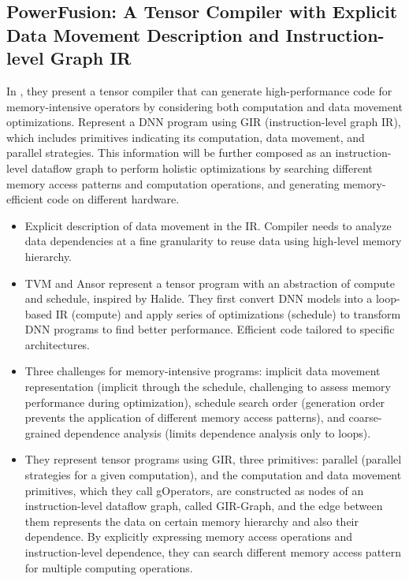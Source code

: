 \subsection{PowerFusion: A Tensor Compiler with Explicit Data Movement Description and Instruction-level Graph IR}
In \cite{ma_powerfusion_2023}, they present a tensor compiler that can generate high-performance code for memory-intensive operators by considering both computation and data movement optimizations. Represent a DNN program using GIR (instruction-level graph IR), which includes primitives indicating its computation, data movement, and parallel strategies. This information will be further composed as an instruction-level dataflow graph to perform holistic optimizations by searching different memory access patterns and computation operations, and generating memory-efficient code on different hardware.
\begin{itemize}
    \item Explicit description of data movement in the IR. Compiler needs to analyze data dependencies at a fine granularity to reuse data using high-level memory hierarchy.
    \item TVM and Ansor represent a tensor program with an abstraction of compute and schedule, inspired by Halide. They first convert DNN models into a loop-based IR (compute) and apply series of optimizations (schedule) to transform DNN programs to find better performance. Efficient code tailored to specific architectures.
    \item Three challenges for memory-intensive programs: implicit data movement representation (implicit through the schedule, challenging to assess memory performance during optimization), schedule search order (generation order prevents the application of different memory access patterns), and coarse-grained dependence analysis (limits dependence analysis only to loops).
    \item They represent tensor programs using GIR, three primitives: parallel (parallel strategies for a given computation), and the computation and data movement primitives, which they call gOperators, are constructed as nodes of an instruction-level dataflow graph, called GIR-Graph, and the edge between them represents the data on certain memory hierarchy and also their dependence. By explicitly expressing memory access operations and instruction-level dependence, they can search different memory access pattern for multiple computing operations.
\end{itemize}